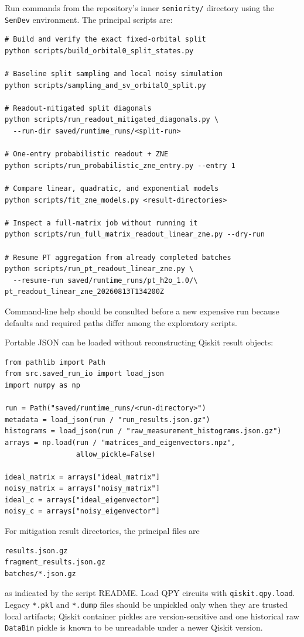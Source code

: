 \documentclass[11pt]{article}
\newcommand{\code}[1]{\texttt{#1}}
\begin{document}
Run commands from the repository's inner \code{seniority/} directory using
the \code{SenDev} environment.  The principal scripts are:
\begin{verbatim}
# Build and verify the exact fixed-orbital split
python scripts/build_orbital0_split_states.py

# Baseline split sampling and local noisy simulation
python scripts/sampling_and_sv_orbital0_split.py

# Readout-mitigated split diagonals
python scripts/run_readout_mitigated_diagonals.py \
  --run-dir saved/runtime_runs/<split-run>

# One-entry probabilistic readout + ZNE
python scripts/run_probabilistic_zne_entry.py --entry 1

# Compare linear, quadratic, and exponential models
python scripts/fit_zne_models.py <result-directories>

# Inspect a full-matrix job without running it
python scripts/run_full_matrix_readout_linear_zne.py --dry-run

# Resume PT aggregation from already completed batches
python scripts/run_pt_readout_linear_zne.py \
  --resume-run saved/runtime_runs/pt_h2o_1.0/\
pt_readout_linear_zne_20260813T134200Z
\end{verbatim}
Command-line help should be consulted before a new expensive run because
defaults and required paths differ among the exploratory scripts.

Portable JSON can be loaded without reconstructing Qiskit result objects:
\begin{verbatim}
from pathlib import Path
from src.saved_run_io import load_json
import numpy as np

run = Path("saved/runtime_runs/<run-directory>")
metadata = load_json(run / "run_results.json.gz")
histograms = load_json(run / "raw_measurement_histograms.json.gz")
arrays = np.load(run / "matrices_and_eigenvectors.npz",
                 allow_pickle=False)

ideal_matrix = arrays["ideal_matrix"]
noisy_matrix = arrays["noisy_matrix"]
ideal_c = arrays["ideal_eigenvector"]
noisy_c = arrays["noisy_eigenvector"]
\end{verbatim}
For mitigation result directories, the principal files are
\begin{verbatim}
results.json.gz
fragment_results.json.gz
batches/*.json.gz
\end{verbatim}
as indicated by the script README.  Load QPY circuits with
\code{qiskit.qpy.load}.  Legacy \code{*.pkl} and \code{*.dump} files should
be unpickled only when they are trusted local artifacts; Qiskit container
pickles are version-sensitive and one historical raw \code{DataBin} pickle is
known to be unreadable under a newer Qiskit version.
\end{document}
